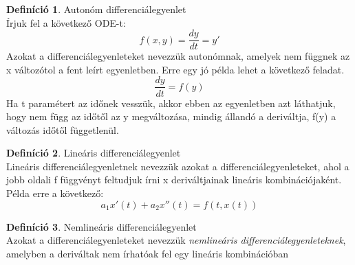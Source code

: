 \documentclass{article}
\theoremstyle{definition}
\theoremstyle{theorem}
\newtheorem{definition}{Definíció}
\begin{document}
\begin{definition}Autonóm differenciálegyenlet\\
Írjuk fel a következő ODE-t:
\begin{equation*}
    f(x,y) = \frac{dy}{dt} = y'
\end{equation*}
Azokat a differenciálegyenleteket nevezzük autonómnak, amelyek nem függnek az x változótol a fent leírt egyenletben. Erre egy jó példa lehet a következő feladat.
\begin{equation*}
    \frac{dy}{dt} = f(y)
\end{equation*}
Ha t paramétert az időnek vesszük, akkor ebben az egyenletben azt láthatjuk, hogy nem függ az időtől az y megváltozása, mindig állandó a deriváltja, f(y) a változás időtől függetlenül.
\end{definition}

\begin{definition}Lineáris differenciálegyenlet\\
Lineáris differenciálegyenletnek nevezzük azokat a differenciálegyenleteket, ahol a jobb oldali f függvényt feltudjuk írni x deriváltjainak lineáris kombinációjaként.
Példa erre a következő:
\begin{equation*}
    a_1 x'(t) + a_2 x''(t) = f(t,x(t))
\end{equation*}
\end{definition}

\begin{definition}Nemlineáris differenciálegyenlet\\
Azokat a differenciálegyenleteket nevezzük \textit{nemlineáris differenciálegyenleteknek}, amelyben a deriváltak nem írhatóak fel egy lineáris kombinációban
\end{definition}
\end{document}
